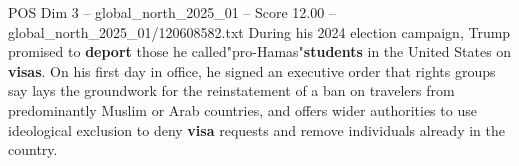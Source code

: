 \begin{textsample}{POS Dim 3 – global\_north\_2025\_01 – Score 12.00 – global\_north\_2025\_01/120608582.txt}
During his 2024 election campaign, Trump promised to \textbf{deport} those he called"pro-Hamas"\textbf{students} in the United States on \textbf{visas}.
On his first day in office, he signed an executive order that rights groups say lays the groundwork for the reinstatement of a ban on travelers from predominantly Muslim or Arab countries, and offers wider authorities to use ideological exclusion to deny \textbf{visa} requests and remove individuals already in the country.

\end{textsample}

